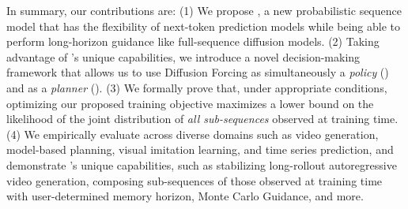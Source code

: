 In summary, our contributions are:
(1) We propose \algons, a new probabilistic sequence model that has the flexibility of next-token prediction models while being able to perform long-horizon guidance like full-sequence diffusion models.
(2) Taking advantage of \algons{}'s unique capabilities, we introduce a novel decision-making framework that allows us to use Diffusion Forcing as simultaneously a \emph{policy} (\cite{chi2023diffusion}) and as a \emph{planner} (\cite{janner2022planning}). 
(3) We formally prove that, under appropriate conditions, optimizing our proposed training objective maximizes a  lower bound on the likelihood of the joint distribution of \emph{all sub-sequences} observed at training time.
(4) We empirically evaluate \algshortseq{} across diverse domains such as video generation, model-based planning, visual imitation learning, and time series prediction, and demonstrate \algshortseq{}'s unique capabilities, such as stabilizing long-rollout autoregressive video generation, composing sub-sequences of those observed at training time with user-determined memory horizon, Monte Carlo Guidance, and more. 


















